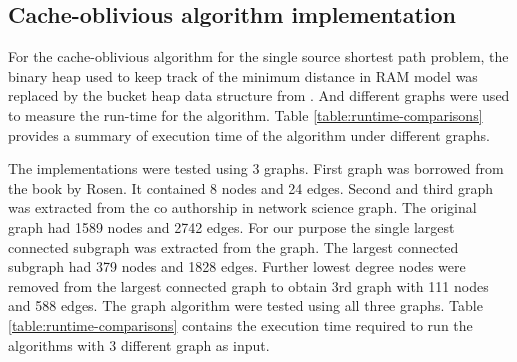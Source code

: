 \documentclass[final,3p]{CSP}
\begin{document}
    \subsection{Cache-oblivious algorithm implementation}
    For the cache-oblivious algorithm for the single source shortest path problem, the binary heap used to keep track of the minimum distance in RAM model was replaced by the bucket heap data structure from \cite{brodal2004cache}. And different graphs were used to measure the run-time for the algorithm. Table \ref{table:runtime-comparisons} provides a summary of execution time of the algorithm under different graphs.

    \bigskip

    The implementations were tested using 3 graphs. First graph was borrowed from the book by Rosen\cite{rosen1999discrete}. It contained 8 nodes and 24 edges. Second and third graph was extracted from the co authorship in network science graph\cite{network}. The original graph had 1589 nodes and 2742 edges. For our purpose the single largest connected subgraph was extracted from the graph. The largest connected subgraph had 379 nodes and 1828 edges. Further lowest degree nodes were removed from the largest connected graph to obtain 3rd graph with 111 nodes and 588 edges.
    The graph algorithm were tested using all three graphs. Table \ref{table:runtime-comparisons} contains the execution time required to run the algorithms with 3 different graph as input.
\end{document}
